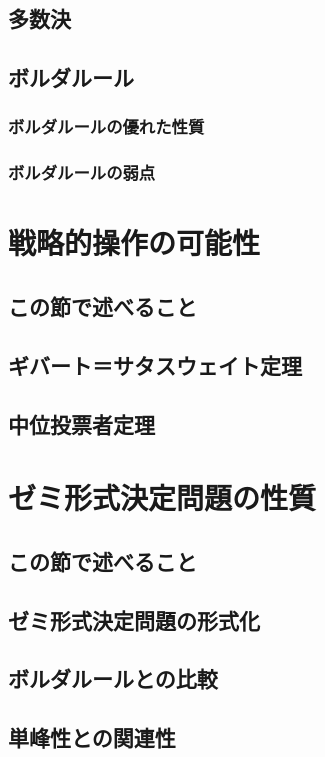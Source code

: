 \documentclass{jsarticle}
\begin{document}
\subsection{多数決}

\subsection{ボルダルール}
\subsubsection{ボルダルールの優れた性質}
\subsubsection{ボルダルールの弱点}

\section{戦略的操作の可能性}
\subsection{この節で述べること}
\subsection{ギバート＝サタスウェイト定理}
\subsection{中位投票者定理}

\section{ゼミ形式決定問題の性質}
\subsection{この節で述べること}
\subsection{ゼミ形式決定問題の形式化}
\subsection{ボルダルールとの比較}
\subsection{単峰性との関連性}
\end{document}
